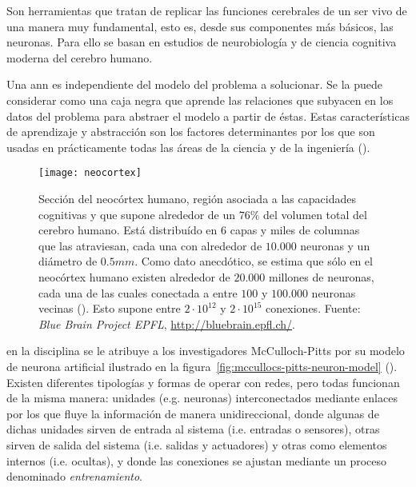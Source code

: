 Son herramientas que tratan de replicar las funciones cerebrales de un ser vivo de una manera muy fundamental, esto es, desde sus componentes más básicos, las neuronas. Para ello se basan en estudios de neurobiología y de ciencia cognitiva moderna del cerebro humano.

Una \ac{ann} es independiente del modelo del problema a solucionar. Se la puede considerar como una caja negra que aprende las relaciones que subyacen en los datos del problema para abstraer el modelo a partir de éstas. Estas características de aprendizaje y abstracción son los factores determinantes por los que son usadas en prácticamente todas las áreas de la ciencia y de la ingeniería (\cite{Du2006}).

\begin{figure}
	\texttt{[image: neocortex]}
	\caption[Ilustración de una sección del neocórtex humano]{Sección del neocórtex humano, región asociada a las capacidades cognitivas y que supone alrededor de un $76\%$ del volumen total del cerebro humano. Está distribuído en $6$ capas y miles de columnas que las atraviesan, cada una con alrededor de $10.000$ neuronas y un diámetro de $0.5mm$.  Como dato anecdótico, se estima que sólo en el neocórtex humano existen alrededor de $20.000$ millones de neuronas, cada una de las cuales conectada a entre $100$ y $100.000$ neuronas vecinas (\cite{Pakkenberg1997}). Esto supone entre $2 \cdot 10^{12}$ y $2 \cdot 10^{15}$ conexiones. Fuente: \textit{Blue Brain Project EPFL}, \url{http://bluebrain.epfl.ch/}.}
	\label{fig:neocortex}
\end{figure}

 en la disciplina se le atribuye a  los investigadores McCulloch-Pitts por su modelo de neurona artificial ilustrado en la figura~\ref{fig:mccullocs-pitts-neuron-model} (\cite{McCulloch1943}). Existen diferentes tipologías y formas de operar con redes, pero todas funcionan de la misma manera: unidades (e.g. neuronas) interconectados mediante enlaces por los que fluye la información de manera unidireccional, donde algunas de dichas unidades sirven de entrada al sistema (i.e. entradas o sensores), otras sirven de salida del sistema (i.e. salidas y actuadores) y otras como elementos internos (i.e. ocultas), y donde las conexiones se ajustan mediante un proceso denominado \textit{entrenamiento}.

